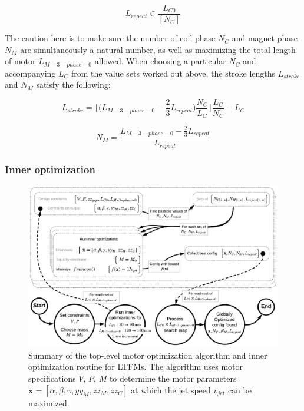                 
                \begin{equation}
                    L_{repeat} \in \frac{L_{C0}}{[N_C]}
                    \label{eq:chap/rsm/LTFM/list of L_repeat}
                \end{equation}
                
                
                The caution here is to make sure the number of coil-phase $N_C$ and magnet-phase $N_M$ are simultaneously a natural number, as well as maximizing the total length of motor $L_{M-3-phase-0}$ allowed. When choosing a particular $N_C$ and accompanying $L_C$ from the value sets worked out above, the stroke lengths $L_{stroke}$ and $N_M$ satisfy the following:
    
                
                \begin{equation}
                    L_{stroke} = \Bigg\lfloor \bigg(L_{M-3-phase-0}-\frac{2}{3} L_{repeat}\bigg) \frac{ N_C}{L_C} \Bigg\rfloor \frac{L_C}{N_C}-L_C
                    \label{eq:chap/rsm/LTFM/L_stroke_2}
                \end{equation}
                
                
                \begin{equation}
                    N_M = \frac{L_{M-3-phase-0}-\frac{2}{3} L_{repeat}}{L_{repeat}}
                    \label{eq:chap/rsm/LTFM/N_M}
                \end{equation}


            \subsubsection{Inner optimization}         \label{Chapter:RSM/LTFM/Optimization/Inner}
            
                \begin{figure}[h]
                  \centering
                  \includegraphics[width=5.9in]{chap4/images3/RSM_LTFM_optimization.pdf}
                  \caption{Summary of the top-level motor optimization algorithm and inner optimization routine for \acsp{LTFM}. The algorithm uses motor specifications $V$, $P$, $M$ to determine the motor parameters $\textbf{x}=[\alpha,\beta,\gamma,yy_M,zz_M,zz_C]$ at which the jet speed $v_{jet}$ can be maximized.}
                  \label{fig:chapter/rsm/LTFM/top level optmization}
                \end{figure}
    
